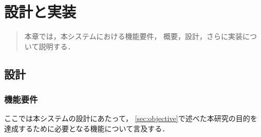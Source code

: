 \chapter{設計と実装}
\begin{large}
\begin{quote}
本章では，本システムにおける機能要件，
概要，設計，さらに実装について説明する．
\end{quote}
\end{large}
\clearpage


\section{設計}

\subsection{機能要件}\label{sec:requirements}
ここでは本システムの設計にあたって，
\ref{sec:objective}で述べた本研究の目的を
達成するために必要となる機能について言及する．

